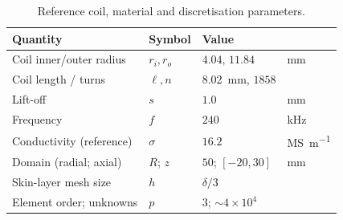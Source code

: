 \documentclass[preprint]{elsarticle}
\begin{document}
\begin{table}[tb]
  \centering
  \caption{Reference coil, material and discretisation parameters.}
  \label{tab:params}
  \begin{tabular}{llll}
    \toprule
    Quantity & Symbol & Value & \\
    \midrule
    Coil inner/outer radius & $r_i,r_o$ & $4.04,\,11.84$ & \si{\milli\metre}\\
    Coil length / turns     & $\ell,n$  & \SI{8.02}{\milli\metre}, $1858$ & \\
    Lift-off                & $s$       & $1.0$ & \si{\milli\metre}\\
    Frequency               & $f$       & $240$ & \si{\kilo\hertz}\\
    Conductivity (reference)& $\sigma$  & $16.2$ & \si{\mega\siemens\per\metre}\\
    Domain (radial; axial)  & $R$; $z$  & $50$; $[-20,30]$ & \si{\milli\metre}\\
    Skin-layer mesh size    & $h$       & $\delta/3$ & \\
    Element order; unknowns & $p$       & $3$; ${\sim}4\times10^4$ & \\
    \bottomrule
  \end{tabular}
\end{table}
\end{document}
